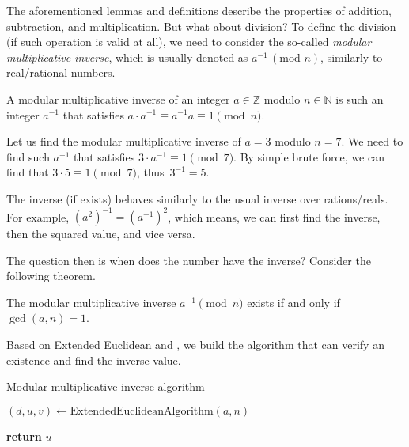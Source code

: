 \documentclass[../lecture-notes-148x210.tex]{subfiles}
\begin{document}
The aforementioned lemmas and definitions describe the properties of addition, subtraction, and multiplication. But what about division? To define the division (if such operation is valid at all), we need to consider the so-called \emph{modular multiplicative inverse}, which is usually denoted as $a^{-1} \, (\text{mod } n)$, similarly to real/rational numbers.

\begin{definition}
    A modular multiplicative inverse of an integer $a \in \mathbb{Z}$ modulo $n \in \mathbb{N}$ is such an integer $a^{-1}$ that satisfies $a \cdot a^{-1} \equiv a^{-1}a \equiv 1 \pmod{n}$.
\end{definition}

\begin{example}
    Let us find the modular multiplicative inverse of $a = 3$ modulo $n = 7$.
    We need to find such $a^{-1}$ that satisfies $3 \cdot a^{-1} \equiv 1 \pmod{7}$.
    By simple brute force, we can find that $3 \cdot 5 \equiv 1 \pmod{7}$, thus~$3^{-1} = 5$.
\end{example}

\begin{remark}
    The inverse (if exists) behaves similarly to the usual inverse over rations/reals. For example, $(a^{2})^{-1} = (a^{-1})^{2}$, which means, we can first find the inverse, then the squared value, and vice versa.
\end{remark}

The question then is when does the number have the inverse? Consider the following theorem.

\begin{theorem}\label{th:inverse_existence}
    The modular multiplicative inverse $a^{-1} \pmod{n}$ exists if and only if $\gcd(a, n) = 1$.
\end{theorem}

Based on Extended Euclidean  and , we build the algorithm that can verify an existence and find the inverse value.

\begin{algorithm}[H]
    \caption{Modular multiplicative inverse algorithm} \label{alg:modular_inverse}
        
    $(d, u, v) \gets \text{ExtendedEuclideanAlgorithm}(a, n)$ 


    \textbf{return} $u$
\end{algorithm}
\end{document}
